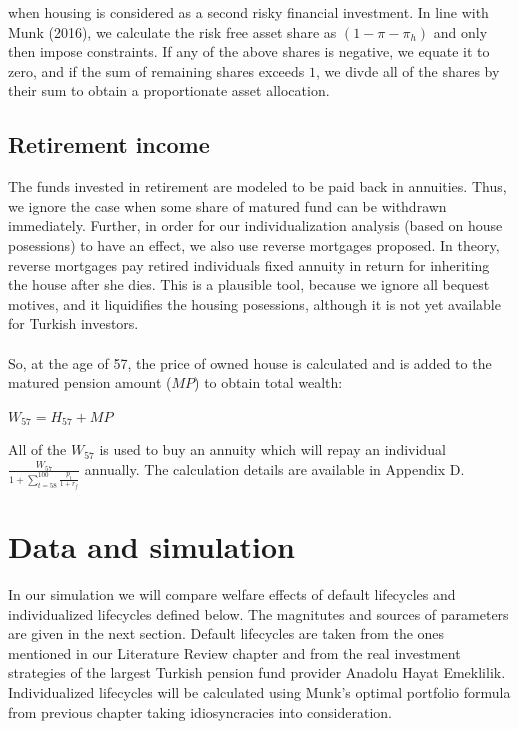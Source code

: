 \documentclass[]{elsarticle}
\begin{document}
when housing is considered as a second risky financial investment. In line with Munk (2016), we calculate the risk free asset share as $\left( 1 - \pi - \pi_h \right)$ and only then impose constraints. If any of the above shares is negative, we equate it to zero, and if the sum of remaining shares exceeds $1$, we divde all of the shares by their sum to obtain a proportionate asset allocation. 

\subsection{Retirement income}

The funds invested in retirement are modeled to be paid back in annuities. Thus, we ignore the case when some share of matured fund can be withdrawn immediately. Further, in order for our individualization analysis (based on house posessions) to have an effect, we also use reverse mortgages proposed. In theory, reverse mortgages pay retired individuals fixed annuity in return for inheriting the house after she dies. This is a plausible tool, because we ignore all bequest motives, and it liquidifies the housing posessions, although it is not yet available for Turkish investors. 

\paragraph{}So, at the age of 57, the price of owned house is calculated and is added to the matured pension amount ($MP$) to obtain total wealth:

\begin{center}
	$W_{57} = H_{57} + MP$
\end{center}

All of the $W_{57}$ is used to buy an annuity which will repay an individual $\frac{W_{57}}{1+\sum^{100}_{t=58} \frac{p_t}{1+r_f}}$ annually. The calculation details are available in Appendix D. 

\section{Data and simulation}
\label{data}

In our simulation we will compare welfare effects of default lifecycles and individualized lifecycles defined below. The magnitutes and sources of parameters are given in the next section. Default lifecycles are taken from the ones mentioned in our Literature Review chapter and from the real investment strategies of the largest Turkish pension fund provider Anadolu Hayat Emeklilik. Individualized lifecycles will be calculated using Munk's optimal portfolio formula from previous chapter taking idiosyncracies into consideration.
\end{document}
